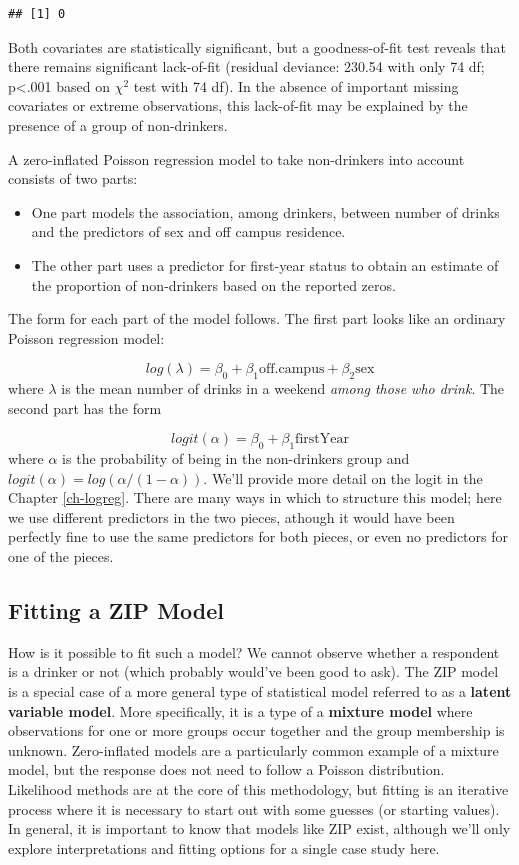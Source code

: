 \documentclass[
]{krantz}
\providecommand{\tightlist}{%
  \setlength{\itemsep}{0pt}\setlength{\parskip}{0pt}}
\begin{document}
\begin{verbatim}
## [1] 0
\end{verbatim}

Both covariates are statistically significant, but a goodness-of-fit test reveals that there remains significant lack-of-fit (residual deviance: 230.54 with only 74 df; p\textless.001 based on \(\chi^2\) test with 74 df). In the absence of important missing covariates or extreme observations, this lack-of-fit may be explained by the presence of a group of non-drinkers.

A zero-inflated Poisson regression model to take non-drinkers into account consists of two parts:

\begin{itemize}
\tightlist
\item
  One part models the association, among drinkers, between number of drinks and the predictors of sex and off campus residence.
\item
  The other part uses a predictor for first-year status to obtain an estimate of the proportion of non-drinkers based on the reported zeros.
\end{itemize}

The form for each part of the model follows. The first part looks like an ordinary Poisson regression model:

\[
log(\lambda)=\beta_0+\beta_1\textrm{off.campus}+ \beta_2\textrm{sex}
\]
where \(\lambda\) is the mean number of drinks in a weekend \emph{among those who drink}.
The second part has the form

\[
logit(\alpha)=\beta_0+\beta_1\textrm{firstYear}
\]
where \(\alpha\) is the probability of being in the non-drinkers group and \(logit(\alpha) = log( \alpha/(1-\alpha))\). We'll provide more detail on the logit in the Chapter \ref{ch-logreg}. There are many ways in which to structure this model; here we use different predictors in the two pieces, athough it would have been perfectly fine to use the same predictors for both pieces, or even no predictors for one of the pieces.

\hypertarget{fitting-a-zip-model}{%
\subsection{Fitting a ZIP Model}\label{fitting-a-zip-model}}

How is it possible to fit such a model? We cannot observe whether a respondent is a drinker or not (which probably would've been good to ask). The ZIP model is a special case of a more general type of statistical model referred to as a \textbf{latent variable model}. More specifically, it is a type of a \textbf{mixture model}  where observations for one or more groups occur together and the group membership is unknown. Zero-inflated models are a particularly common example of a mixture model, but the response does not need to follow a Poisson distribution. Likelihood methods are at the core of this methodology, but fitting is an iterative process where it is necessary to start out with some guesses (or starting values). In general, it is important to know that models like ZIP exist, although we'll only explore interpretations and fitting options for a single case study here.
\end{document}
